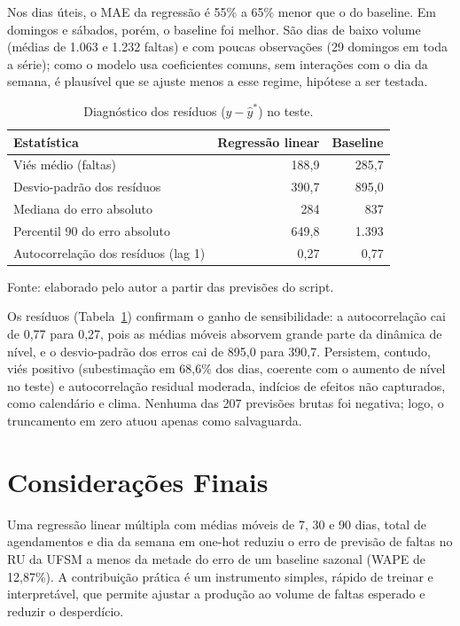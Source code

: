 \documentclass[11pt]{article}
\begin{document}
Nos dias úteis, o MAE da regressão é 55\% a 65\% menor que o do baseline. Em domingos e sábados, porém, o baseline foi melhor. São dias de baixo volume (médias de 1.063 e 1.232 faltas) e com poucas observações (29 domingos em toda a série); como o modelo usa coeficientes comuns, sem interações com o dia da semana, é plausível que se ajuste menos a esse regime, hipótese a ser testada.

\begin{table}[htbp]
\centering
\small
\caption{Diagnóstico dos resíduos ($y-\hat{y}^{*}$) no teste.}
\label{tab:residuos}
\begin{tabular}{@{}lrr@{}}
\toprule
Estatística & Regressão linear & Baseline \\
\midrule
Viés médio (faltas) & 188,9 & 285,7 \\
Desvio-padrão dos resíduos & 390,7 & 895,0 \\
Mediana do erro absoluto & 284 & 837 \\
Percentil 90 do erro absoluto & 649,8 & 1.393 \\
Autocorrelação dos resíduos (lag 1) & 0,27 & 0,77 \\
\bottomrule
\end{tabular}
\begin{flushleft}\footnotesize Fonte: elaborado pelo autor a partir das previsões do script.\end{flushleft}
\end{table}

Os resíduos (Tabela~\ref{tab:residuos}) confirmam o ganho de sensibilidade: a autocorrelação cai de 0,77 para 0,27, pois as médias móveis absorvem grande parte da dinâmica de nível, e o desvio-padrão dos erros cai de 895,0 para 390,7. Persistem, contudo, viés positivo (subestimação em 68,6\% dos dias, coerente com o aumento de nível no teste) e autocorrelação residual moderada, indícios de efeitos não capturados, como calendário e clima. Nenhuma das 207 previsões brutas foi negativa; logo, o truncamento em zero atuou apenas como salvaguarda.

\section{Considerações Finais}

Uma regressão linear múltipla com médias móveis de 7, 30 e 90 dias, total de agendamentos e dia da semana em one-hot reduziu o erro de previsão de faltas no RU da UFSM a menos da metade do erro de um baseline sazonal (WAPE de 12,87\%). A contribuição prática é um instrumento simples, rápido de treinar e interpretável, que permite ajustar a produção ao volume de faltas esperado e reduzir o desperdício.
\end{document}
